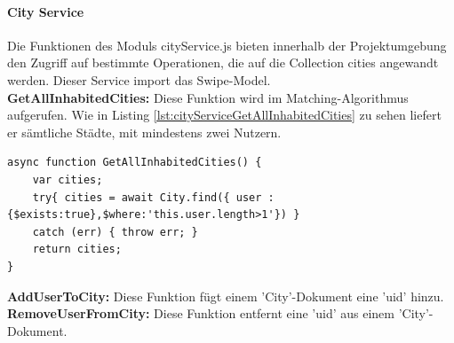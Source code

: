 %
%
\paragraph{City Service}
Die Funktionen des Moduls cityService.js bieten innerhalb der Projektumgebung den Zugriff auf bestimmte Operationen, die auf die Collection cities angewandt werden. Dieser Service import das Swipe-Model.\\

\noindent
\textbf{GetAllInhabitedCities:}
Diese Funktion wird im Matching-Algorithmus aufgerufen. Wie in Listing \ref{lst:cityServiceGetAllInhabitedCities} zu sehen liefert er sämtliche Städte, mit mindestens zwei Nutzern. \\

\begin{lstlisting}[caption=City Service - GetAllInhabitedCities, label=lst:cityServiceGetAllInhabitedCities]
async function GetAllInhabitedCities() {
    var cities;
    try{ cities = await City.find({ user : {$exists:true},$where:'this.user.length>1'}) }
    catch (err) { throw err; }
    return cities;
}
\end{lstlisting}

\noindent
\textbf{AddUserToCity:}
Diese Funktion fügt einem 'City'-Dokument eine 'uid' hinzu.\\

\noindent
\textbf{RemoveUserFromCity:}
Diese Funktion entfernt eine 'uid' aus einem 'City'-Dokument.

